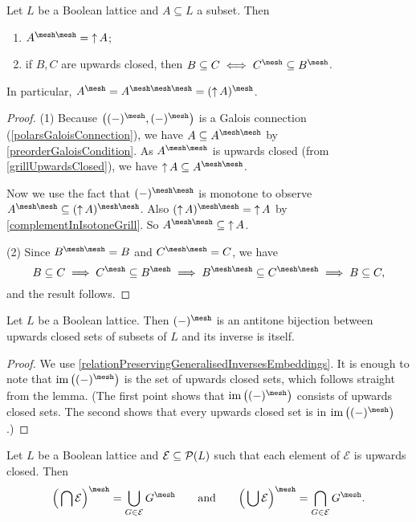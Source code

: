 \begin{lemma} \label{upwardClosureGrill}
Let $L$ be a Boolean lattice and $A \subseteq L$ a subset. Then
\begin{enumerate}
\item $A^{\mesh\mesh} = \upset A$;
\item if $B,C$ are upwards closed, then $B\subseteq C \iff C^\mesh \subseteq B^\mesh$.
\end{enumerate}
\end{lemma}
In particular, $A^\mesh = A^{\mesh\mesh\mesh} = (\upset A)^\mesh$.
\begin{proof}
(1) Because $\big((-)^\mesh, (-)^\mesh\big)$ is a Galois connection (\ref{polarsGaloisConnection}), we have $A \subseteq A^{\mesh\mesh}$ by \ref{preorderGaloisCondition}. As $A^{\mesh\mesh}$ is upwards closed (from \ref{grillUpwardsClosed}), we have $\upset A \subseteq A^{\mesh\mesh}$.

Now we use the fact that $(-)^{\mesh\mesh}$ is monotone to observe $A^{\mesh\mesh} \subseteq (\upset A)^{\mesh\mesh}$. Also $(\upset A)^{\mesh\mesh} = \upset A$ by
\ref{complementInIsotoneGrill}. So $A^{\mesh\mesh} \subseteq \upset A$.

(2) Since $B^{\mesh\mesh} = B$ and $C^{\mesh\mesh} = C$, we have
\[B\subseteq C \implies C^\mesh \subseteq B^\mesh \implies B^{\mesh\mesh} \subseteq C^{\mesh\mesh} \implies B\subseteq C, \]
and the result follows.
\end{proof}
\begin{corollary} \label{grillUpsetOrderSimilarity}
Let $L$ be a Boolean lattice.
Then $(-)^\mesh$ is an antitone bijection between upwards closed sets of subsets of $L$ and its inverse is itself.
\end{corollary}
\begin{proof}
We use \ref{relationPreservingGeneralisedInversesEmbeddings}. It is enough to note that $\im\big((-)^\mesh\big)$ is the set of upwards closed sets, which follows straight from the lemma. (The first point shows that $\im\big((-)^\mesh\big)$ consists of upwards closed sets. The second shows that every upwards closed set is in $\im\big((-)^\mesh\big)$.)
\end{proof}
\begin{corollary} \label{grillIntersectionUnion}
Let $L$ be a Boolean lattice and $\mathcal{E}\subseteq\operatorname{\mathcal{P}}(L)$ such that each element of $\mathcal{E}$ is upwards closed. Then
\[ \Big(\bigcap\mathcal{E}\Big)^\mesh = \bigcup_{G\in\mathcal{E}}G^\mesh \qquad\text{and}\qquad \Big(\bigcup\mathcal{E}\Big)^\mesh = \bigcap_{G\in\mathcal{E}}G^\mesh. \]
\end{corollary}
